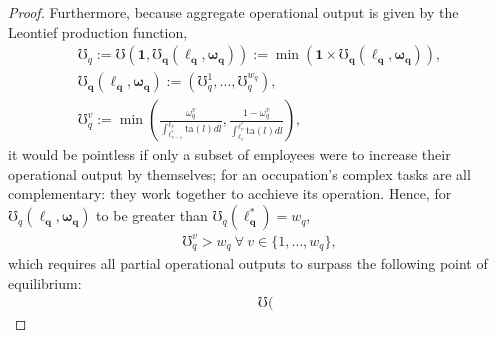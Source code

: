 \documentclass[hidelinks, nonatbib]{elsarticle}
\begin{document}
\begin{lemma}
\begin{proof}
        Furthermore, because aggregate operational output is given by the Leontief production function, 
        \begin{gather}
            \mho_{q}
            :=
            \mho(
                \boldsymbol{1},
                \boldsymbol{\mho_q}(
                    \boldsymbol{\ell_{q}}
                    ,\boldsymbol{\omega_{q}}
                )
            )
            :=
            \min(
                \boldsymbol{1}
                \times
                \boldsymbol{\mho_q}(
                    \boldsymbol{\ell_{q}}
                    ,\boldsymbol{\omega_{q}}
                )
            )
            ,
            \\
            \boldsymbol{\mho_q}(
                \boldsymbol{\ell_{q}}
                ,\boldsymbol{\omega_{q}}
            )
            :=
            (
                \mho_{q}^{1}
                ,
                \dots
                ,
                \mho_{q}^{w_q}
            )
            ,
            \\
            \mho_{q}^{v}
            := 
            \min
            \left(
                    \frac{
                        \omega_{q}^{v}
                    }{
                        \int_{\ell_{v-1}^{*}}^{\ell_v}{
                            \text{ta}(l)dl
                        }
                    }
                    ,
                    \frac{
                        1 - \omega_{q}^{v}
                    }{
                        \int_{\ell_v}^{\ell_{v}^{*}}{
                            \text{ta}(l)dl
                        }
                    }
                \right)
            ,
        \end{gather}
        it would be pointless if only a subset of employees were to increase their operational output by themselves; for an occupation's complex tasks are all complementary: they work together to acchieve its operation. Hence, for $\mho_{q}(
            \boldsymbol{\ell_q}
            ,\boldsymbol{\omega_q}
        )$ to be greater than $
        \mho_{q}(
            \boldsymbol{\ell_{q}^{*}}
        )
        =
        w_q$,
        \begin{gather}
            \mho_{q}^{v} > w_q
            \
            \forall
            \
            v \in \{1, \dots, w_q\}
            ,
        \end{gather}
        which requires all partial operational outputs to surpass the following point of equilibrium:
        \begin{align}
            &\mho(

\end{align}
\end{proof}
\end{lemma}
\end{document}
